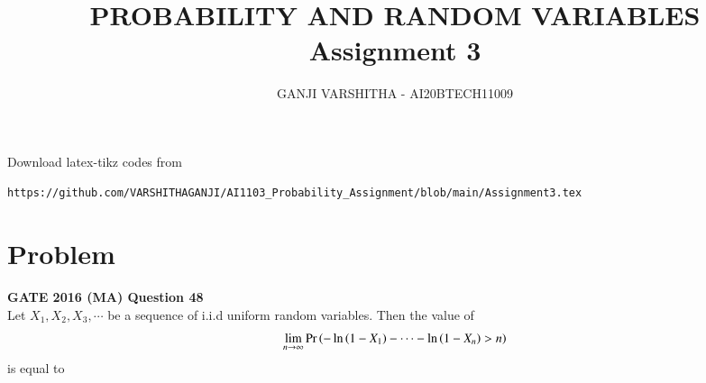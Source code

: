 \documentclass[journal,12pt,twocolumn]{IEEEtran}
\begin{document}
     \def\centbox#1{\makebox[0in]{#1}}
     \def\topbox#1{\raisebox{-\baselineskip}[0in][0in]{#1}}
     \def\midbox#1{\raisebox{-0.5\baselineskip}[0in][0in]{#1}}
\vspace{3cm}
\title{\textbf{PROBABILITY AND RANDOM VARIABLES \\ Assignment 3}}
\author{GANJI VARSHITHA - AI20BTECH11009}
\maketitle
\newpage
\bigskip
\renewcommand{\thefigure}{\theenumi}
\renewcommand{\thetable}{\theenumi}
Download latex-tikz codes from 
%
\begin{lstlisting}
https://github.com/VARSHITHAGANJI/AI1103_Probability_Assignment/blob/main/Assignment3.tex
\end{lstlisting}
\section*{Problem}
\textbf{GATE 2016 (MA) Question 48}
\\
Let $X_{1},X_{2},X_{3},\cdots$ be a sequence of i.i.d uniform  random variables. Then the value of 
\[ \lim_{n\to\infty} \Pr\left(-\ln{\ensuremath{\left(1-X_{1}\right)}}-\cdots-\ln{\ensuremath{\left(1-X_{n}\right)}} > n\right) \] is equal to 
\end{document}

